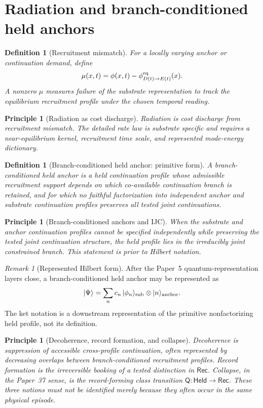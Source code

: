 \documentclass[11pt]{article}
\newtheorem{definition}[theorem]{Definition}
\newtheorem{principle}[theorem]{Principle}
\theoremstyle{remark}
\newtheorem{remark}[theorem]{Remark}
\newcommand{\Held}{\mathsf{Held}}
\newcommand{\Rec}{\mathsf{Rec}}
\begin{document}
\section{Radiation and branch-conditioned held anchors}

\begin{definition}[Recruitment mismatch]
For a locally varying anchor or continuation demand, define
\[
        \mu(x,t)=\phi(x,t)-\phi^{\rm eq}_{D(t)\to E(t)}(x).
\]
A nonzero \(\mu\) measures failure of the substrate representation to track the equilibrium recruitment profile under the chosen temporal reading.
\end{definition}

\begin{principle}[Radiation as cost discharge]
Radiation is cost discharge from recruitment mismatch.  The detailed rate law is substrate specific and requires a near-equilibrium kernel, recruitment time scale, and represented mode-energy dictionary.
\end{principle}

\begin{definition}[Branch-conditioned held anchor: primitive form]
A \emph{branch-conditioned held anchor} is a held continuation profile whose admissible recruitment support depends on which co-available continuation branch is retained, and for which no faithful factorization into independent anchor and substrate continuation profiles preserves all tested joint continuations.
\end{definition}

\begin{principle}[Branch-conditioned anchors and IJC]
When the substrate and anchor continuation profiles cannot be specified independently while preserving the tested joint continuation structure, the held profile lies in the irreducibly joint constrained branch.  This statement is prior to Hilbert notation.
\end{principle}

\begin{remark}[Represented Hilbert form]
After the Paper~5 quantum-representation layers close, a branch-conditioned held anchor may be represented as
\[
        |\Psi\rangle=\sum_n c_n\,|\phi_n\rangle_{\rm sub}\otimes|n\rangle_{\rm anchor}.
\]
The ket notation is a downstream representation of the primitive nonfactorizing held profile, not its definition.
\end{remark}

\begin{principle}[Decoherence, record formation, and collapse]
Decoherence is suppression of accessible cross-profile continuation, often represented by decreasing overlaps between branch-conditioned recruitment profiles.  Record formation is the irreversible booking of a tested distinction in \(\Rec\).  Collapse, in the Paper~37 sense, is the record-forming class transition \(\mathsf Q:\Held\to\Rec\).  These three notions must not be identified merely because they often occur in the same physical episode.
\end{principle}
\end{document}
